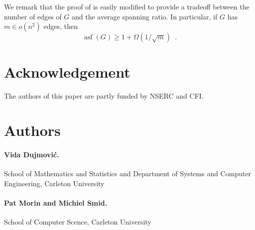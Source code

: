 \documentclass{patmorin}
\DeclareMathOperator{\asf}{asf}
\begin{document}
We remark that the proof of  is easily modified to
provide a tradeoff between the number of edges of $G$ and the average
spanning ratio.  In particular, if $G$ has $m\in o(n^2)$ edges, then
\[
   \asf(G) \ge 1 + \Omega(1/\sqrt{m}) \enspace .
\]


\section*{Acknowledgement}

The authors of this paper are partly funded by NSERC and CFI.

\section*{Authors}

\paragraph{Vida Dujmovi\'c.}
School of Mathematics and Statistics and Department of Systems and Computer Engineering, Carleton University

\paragraph{Pat Morin and Michiel Smid.}
School of Computer Scence, Carleton University




\end{document}
